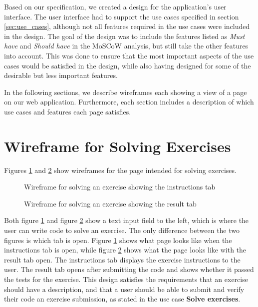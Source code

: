 Based on our specification, we created a design for the application's user interface. The user interface had to support the use cases specified in section \ref{sec:use_cases}, although not all features required in the use cases were included in the design. The goal of the design was to include the features listed as \textit{Must have} and \textit{Should have} in the MoSCoW analysis, but still take the other features into account. This was done to ensure that the most important aspects of the use cases would be satisfied in the design, while also having designed for some of the desirable but less important features.

In the following sections, we describe wireframes each showing a view of a page on our web application. Furthermore, each section includes a description of which use cases and features each page satisfies.

\section{Wireframe for Solving Exercises}
Figures \ref{fig:wfExerciseInstructions} and \ref{fig:wfExerciseResult} show wireframes for the page intended for solving exercises.

\begin{figure}[H]
	\centering
	\caption{Wireframe for solving an exercise showing the instructions tab}
	\label{fig:wfExerciseInstructions}
\end{figure}

\begin{figure}[H]
	\centering
	\caption{Wireframe for solving an exercise showing the result tab}
	\label{fig:wfExerciseResult}
\end{figure}

Both figure \ref{fig:wfExerciseInstructions} and figure \ref{fig:wfExerciseResult} show a text input field to the left, which is where the user can write code to solve an exercise.
The only difference between the two figures is which tab is open.
Figure \ref{fig:wfExerciseInstructions} shows what page looks like when the instructions tab is open, while figure \ref{fig:wfExerciseResult} shows what the page looks like with the result tab open.
The instructions tab displays the exercise instructions to the user.
The result tab opens after submitting the code and shows whether it passed the tests for the exercise.
This design satisfies the requirements that an exercise should have a description, and that a user should be able to submit and verify their code an exercise submission, as stated in the use case \textbf{Solve exercises}.

